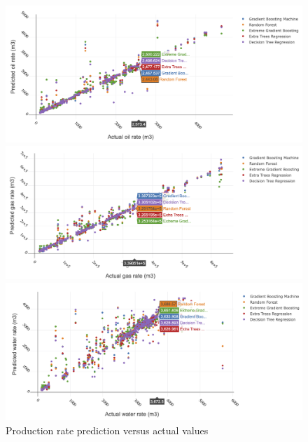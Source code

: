 \documentclass[12pt,a4paper]{report}
\begin{document}
\begin{figure}[H]
      \begin{minipage}[h]{1.0\linewidth}
         \centering
         \includegraphics[width=\linewidth]{MLs/oil}
      \end{minipage}
\vspace{0.00mm}
     \begin{minipage}[h]{1\linewidth}
        \centering
        \includegraphics[width=\linewidth]{MLs/gas}
      \end{minipage}
\hspace{0.00mm}
     \begin{minipage}[h]{1\linewidth}
        \centering
        \includegraphics[width=\linewidth]{MLs/water}
     \end{minipage}
\caption{Production rate prediction versus actual values}
\label{fig:furt}
\end{figure}
\end{document}
